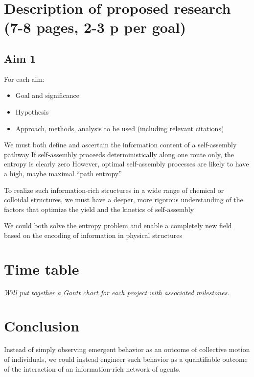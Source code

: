 \documentclass[11pt, oneside]{article}   	%
\begin{document}
\section{Description of proposed research (7-8 pages, 2-3 p per goal)}
\subsection{Aim 1}
For each aim:
\begin{itemize}
\item Goal and significance
\item Hypothesis
\item Approach, methods, analysis to be used (including relevant citations)
\end{itemize}

We must both define and ascertain the information content of a self-assembly pathway
If self-assembly proceeds deterministically along one route only, the entropy is clearly zero
However, optimal self-assembly processes are likely to have a high, maybe maximal ``path entropy''

To realize such information-rich structures in a wide range of chemical or colloidal structures, we must have a deeper, more rigorous understanding of the factors that optimize the yield and the kinetics of self-assembly

We could both solve the entropy problem and enable a completely new field based on the encoding of information in physical structures

\section{Time table}
\textit{Will put together a Gantt chart for each project with associated milestones. 	}

\section{Conclusion}
Instead of simply observing emergent behavior as an outcome of collective motion of individuals, we could instead engineer such behavior as a quantifiable outcome of the interaction of an information-rich network of agents.
\end{document}
